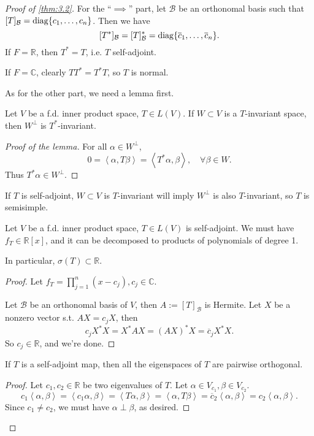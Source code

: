 \begin{proof}[Proof of \autoref{thm:3.2}]
    For the ``$\implies$'' part,
	let $\mathcal{B}$ be an orthonomal basis
	such that $[T]_{\mathcal{B}} = \operatorname{diag}\{c_1,\dots, c_n\}$.
	Then we have
	\[
		[T^*]_{\mathcal{B}} = [T]_{\mathcal{B}}^* =
		\operatorname{diag}\{\overline{c}_1, \dots, \overline{c}_n\}.
	\]
	If $F = \mathbb{R}$, then $T^* = T$, i.e. $T$ self-adjoint.

	If $F = \mathbb{C}$, clearly $TT^* = T^*T$, so $T$ is normal.

	As for the other part, we need a lemma first.
	\begin{lemma}
		Let $V$ be a f.d. inner product space, $T\in L(V)$.
		If $W \subset V$ is a $T$-invariant space, then $W^\perp$ is
		$T^*$-invariant.
	\end{lemma}
	\begin{proof}[Proof of the lemma]
	    For all $\alpha\in W^\perp$,
		 \[
		0 = \left<\alpha, T\beta \right> = \left<T^*\alpha, \beta \right>,\quad
		\forall \beta\in W.
		\]
		Thus $T^*\alpha\in W^\perp$.
	\end{proof}

	\begin{corollary}
	    If $T$ is self-adjoint, $W \subset V$ is $T$-invariant
		will imply $W^\perp$ is also $T$-invariant, so $T$ is semisimple.
	\end{corollary}

	\begin{lemma}
		Let $V$ be a f.d. inner product space, $T\in L(V)$ is self-adjoint.
		We must have $f_T\in \mathbb{R}[x]$, and it can be decomposed to
		products of polynomials of degree 1.

		In particular, $\sigma(T) \subset \mathbb{R}$.
	\end{lemma}
	\begin{proof}[Proof]
	    Let $f_T = \prod_{j=1}^n (x - c_j), c_j \in \mathbb{C}$.

		Let $\mathcal{B}$ be an orthonomal basis of $V$,
		then $A := [T]_{\mathcal{B}}$ is Hermite.
		Let $X$ be a nonzero vector s.t. $AX = c_j X$, then
		\[
		c_j X^*X = X^*AX = (AX)^*X = \overline{c}_j X^*X.
		\]
		So $c_j\in \mathbb{R}$, and we're done.
	\end{proof}

	\begin{lemma}
		If $T$ is a self-adjoint map, then all the eigenspaces of $T$ are
		pairwise orthogonal.
	\end{lemma}
	\begin{proof}[Proof]
	    Let $c_1, c_2\in \mathbb{R}$ be two eigenvalues of $T$.
		Let $\alpha\in V_{c_1}, \beta \in V_{c_2}$.
		\[
		c_1 \left<\alpha, \beta \right> = \left<c_1\alpha, \beta \right>
		= \left<T\alpha, \beta \right> = \left<\alpha, T\beta \right>
		= \overline{c}_2 \left<\alpha, \beta \right> = c_2 \left<\alpha, \beta \right>.
		\]
		Since $c_1\ne c_2$, we must have $\alpha\perp \beta$, as desired.
	\end{proof}


\end{proof}
